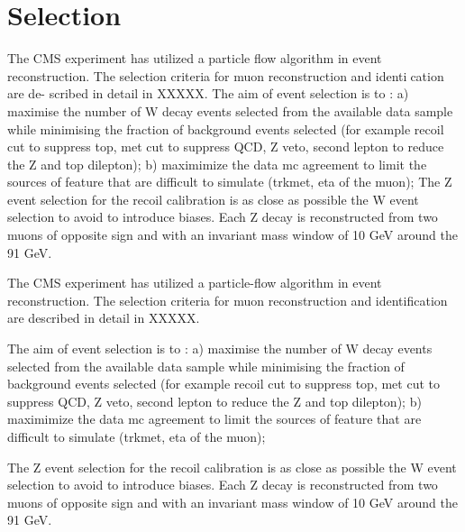 \section{Selection}
\label{sec:Sel}

The CMS experiment has utilized a particle flow algorithm in event reconstruction. The selection criteria for muon reconstruction and identication are de-
scribed in detail in XXXXX.
The aim of event selection is to :
a) maximise the number of W decay events selected from the available data sample while minimising the fraction
of background events selected (for example recoil cut to suppress top, met cut
to suppress QCD, Z veto, second lepton to reduce the Z and top dilepton);
b) maximimize the data mc agreement to limit the sources of feature that are difficult to simulate (trkmet, eta of the muon);
The Z event selection for the recoil calibration is as close as possible the W event selection to avoid to introduce biases. Each Z decay is reconstructed
from two muons of opposite sign and with an invariant mass window of 10 GeV around the 91 GeV.

The CMS experiment has utilized a particle-flow algorithm in event reconstruction.
The selection criteria for muon reconstruction and identification are described in detail in XXXXX.

The aim of event selection is to :
a) maximise the number of W decay events selected from the available data sample while minimising the fraction of background events selected (for example recoil cut to suppress top, met cut to suppress QCD, Z veto, second lepton to reduce the Z and top dilepton);
b) maximimize the data mc agreement to limit the sources of feature that are difficult to simulate (trkmet, eta of the muon);

The Z event selection for the recoil calibration is as close as possible the W event selection to avoid to introduce biases.
Each Z decay is reconstructed from two muons of opposite sign and with an invariant mass window of 10 GeV around the 91 GeV.